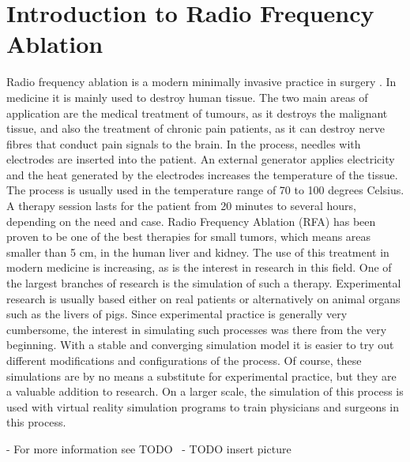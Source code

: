 \documentclass[parskip=half, titlepage=yes, 12pt, BCOR=12mm, DIV=calc]{scrartcl}
\begin{document}
\maketitle
\tableofcontents

\clearpage




\section{Introduction to Radio Frequency Ablation}
Radio frequency ablation is a modern minimally invasive practice in surgery . In medicine it is mainly used to destroy human tissue. The two main areas of application are the medical treatment of tumours, as it destroys the malignant tissue, and also the treatment of chronic pain patients, as it can destroy nerve fibres that conduct pain signals to the brain. In the process, needles with electrodes are inserted into the patient. An external generator applies electricity and the heat generated by the electrodes increases the temperature of the tissue. The process is usually used in the temperature range of 70 to 100 degrees Celsius. A therapy session lasts for the patient from 20 minutes to several hours, depending on the need and case.
Radio Frequency Ablation (RFA) has been proven to be one of the best therapies for small tumors, which means areas smaller than 5 cm, in the human liver and kidney. The use of this treatment in modern medicine is increasing, as is the interest in research in this field. 
One of the largest branches of research is the simulation of such a therapy. Experimental research is usually based either on real patients or alternatively on animal organs such as the livers of pigs. Since experimental practice is generally very cumbersome, the interest in simulating such processes was there from the very beginning.  
With a stable and converging simulation model it is easier to try out different modifications and configurations of the process. Of course, these simulations are by no means a substitute for experimental practice, but they are a valuable addition to research. 
On a larger scale, the simulation of this process is used with virtual reality simulation programs to train physicians and surgeons in this process.

- For more information see TODO \
- TODO insert picture
\end{document}
